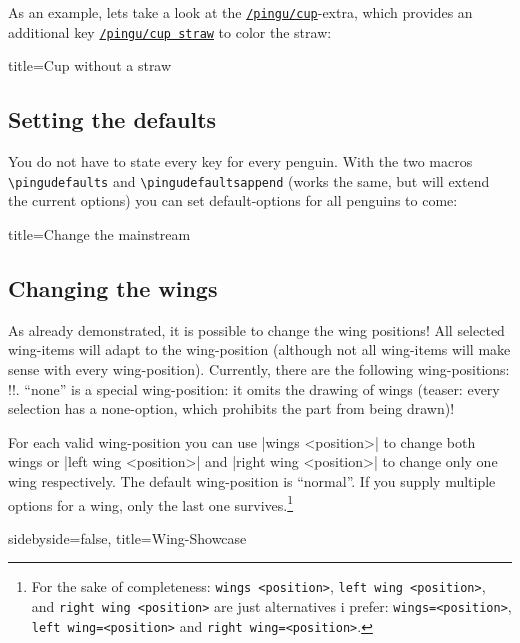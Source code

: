 \documentclass[parskip=half,english,numbers=noenddot,footnotes=nomultiple,oneside]{scrartcl}
\makeatletter
\let\say\enquote
\def\DTLlistformatitem#1{\textit{#1}}
\newcommand*\typesetselection[1][]{\begingroup\ifx!#1!\else\def\DTLlistformatitem##1{#1}\fi\dotypesetselection}
\def\dotypesetselection#1{\expandafter\DTLformatlist\expandafter{\csname @pingu@#1@\endcsname}\endgroup}
\def\ipingu#1{\lstinline'#1'}
\def\lpingu#1{\lstinline[style=lstpingu,language=pingulang]'#1'}
\newcommand*\keyref[2][/pingu/]{\hyperref[pk:#1#2]{\lpingu{#1#2}}}
\makeatother
\begin{document}
As an example, lets take a look at the \keyref{cup}-extra, which provides an additional key \keyref{cup straw} to color the straw:
\begin{tcblisting}{title={Cup without a straw}}
\begin{tikzpicture}
	\pingu[wings grab, cup=pingu@purple,
	       cup straw=pingu@blue]
	\pingu[wings grab, cup, xshift=2.8cm,
	       cup straw=!hide]
\end{tikzpicture}
\end{tcblisting}

\subsection{Setting the defaults}
You do not have to state every key for every penguin.
With the two macros \lstinline[language=pingulang]'\pingudefaults' and \lstinline[language=pingulang]'\pingudefaultsappend' (works the same, but will extend the current options) you can set default-options for all penguins to come:
\begin{tcblisting}{title={Change the mainstream}}
\end{tcblisting}

\subsection{Changing the wings}
\label{subsec:wings}As already demonstrated, it is possible to change the wing positions!
All selected wing-items will adapt to the wing-position (although not all wing-items will make sense with every wing-position).
Currently, there are the following wing-positions:
\typesetselection{leftwing}. \say{none} is a special wing-position: it omits the drawing of wings (teaser: every selection has a none-option, which prohibits the part from being drawn)!

For each valid wing-position you can use |wings <position>| to change both wings or |left wing <position>| and |right wing <position>| to change only one wing respectively. The default wing-position is \say{normal}. If you supply multiple options for a wing, only the last one survives.\footnote{For the sake of completeness: \ipingu{wings <position>}, \ipingu{left wing <position>}, and \ipingu{right wing <position>} are just alternatives i prefer: \ipingu{wings=<position>}, \ipingu{left wing=<position>} and \ipingu{right wing=<position>}.}
\begin{tcblisting}{sidebyside=false, title=Wing-Showcase}
\begin{tikzpicture}
	\pingu[left wing none, heart=green]
	\pingu[wings wave, heart=teal, xshift=3.5cm]
	\pingu[wings hug, heart=orange, xshift=7cm]
	\pingu[left wing grab, right wing shock, heart=purple,  xshift=10.5cm]
\end{tikzpicture}
\end{tcblisting}
\end{document}
